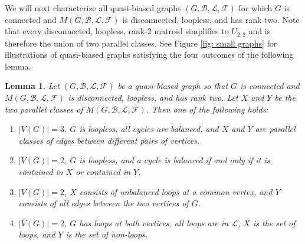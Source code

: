 \documentclass[12pt]{article}
\newtheorem{lemma}[theorem]{Lemma}
\theoremstyle{definition}
\theoremstyle{plain} %
\newcommand{\cB}{\mathcal{B}}
\newcommand{\cF}{\mathcal{F}}
\newcommand{\cL}{\mathcal{L}}
\begin{document}
We will next characterize all quasi-biased graphs $(G, \cB, \cL, \cF)$ for which $G$ is connected and $M(G, \cB, \cL, \cF)$ is disconnected, loopless, and has rank two.
Note that every disconnected, loopless, rank-$2$ matroid simplifies to $U_{2,2}$ and is therefore the union of two parallel classes.
See Figure \ref{fig: small graphs} for illustrations of quasi-biased graphs satisfying the four outcomes of the following lemma.

\begin{lemma} \label{lem: rank-2 disconnected loopless quasi-biased graphs}
    Let $(G, \cB, \cL, \cF)$ be a quasi-biased graph so that $G$ is connected and $M(G, \cB, \cL, \cF)$ is disconnected, loopless, and has rank two. 
    Let $X$ and $Y$ be the two parallel classes of $M(G, \cB, \cL, \cF)$.
    Then one of the following holds:

    \begin{enumerate}[$(i)$]
        \item $|V(G)| = 3$, $G$ is loopless, all cycles are balanced, and $X$ and $Y$ are parallel classes of edges between different pairs of vertices.

        \item $|V(G)| = 2$, $G$ is loopless, and a cycle is balanced if and only if it is contained in $X$ or contained in $Y$.

        \item $|V(G)| = 2$, $X$ consists of unbalanced loops at a common vertex, and $Y$ consists of all edges between the two vertices of $G$.
    
        \item $|V(G)| = 2$, $G$ has loops at both vertices, all loops are in $\cL$, $X$ is the set of loops, and $Y$ is the set of non-loops.
    \end{enumerate}
\end{lemma}
\end{document}
